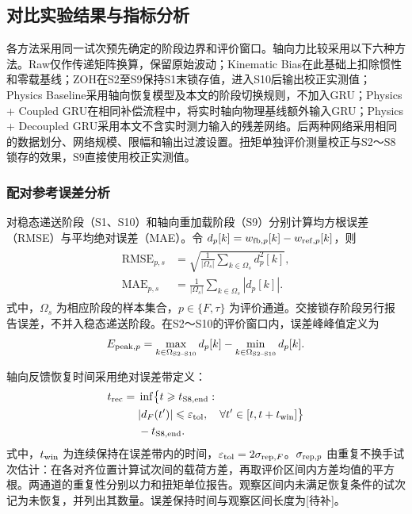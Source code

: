 \documentclass{JQRnew}
\providecommand{\RevisionColor}{\color{black}}
\newcommand{\revbegin}{\begingroup\RevisionColor}
\newcommand{\revend}{\par\endgroup}
\begin{document}
\subsection{对比实验结果与指标分析}

\revbegin
各方法采用同一试次预先确定的阶段边界和评价窗口。轴向力比较采用以下六种方法。Raw仅作传递矩阵换算，保留原始波动；Kinematic Bias在此基础上扣除惯性和零载基线；ZOH在S2至S9保持S1末锁存值，进入S10后输出校正实测值；Physics Baseline采用轴向恢复模型及本文的阶段切换规则，不加入GRU；Physics + Coupled GRU在相同补偿流程中，将实时轴向物理基线额外输入GRU；Physics + Decoupled GRU采用本文不含实时测力输入的残差网络。后两种网络采用相同的数据划分、网络规模、限幅和输出过渡设置。扭矩单独评价测量校正与S2～S8锁存的效果，S9直接使用校正实测值。
\revend

\revbegin
\subsubsection{配对参考误差分析}
\revend

\revbegin
对稳态递送阶段（S1、S10）和轴向重加载阶段（S9）分别计算均方根误差（RMSE）与平均绝对误差（MAE）。令 $d_p[k]=w_{{\rm fb},p}[k]-w_{{\rm ref},p}[k]$，则
\begin{align}
\label{eq:rmse-mae}
\begin{aligned}
\mathrm{RMSE}_{p,s}&=\sqrt{\frac{1}{|\Omega_s|}\sum_{k\in\Omega_s}d_p^2[k]},\\
\mathrm{MAE}_{p,s}&=\frac{1}{|\Omega_s|}\sum_{k\in\Omega_s}|d_p[k]|.
\end{aligned}
\end{align}
式中，$\Omega_s$ 为相应阶段的样本集合，$p\in\{F,\tau\}$ 为评价通道。交接锁存阶段另行报告误差，不并入稳态递送阶段。在S2～S10的评价窗口内，误差峰峰值定义为
\begin{align}
\label{eq:peak-error}
E_{{\rm peak},p}=
\max_{k\in\Omega_{\rm S2\text{--}S10}}d_p[k]
-\min_{k\in\Omega_{\rm S2\text{--}S10}}d_p[k].
\end{align}
\revend

\revbegin
轴向反馈恢复时间采用绝对误差带定义：
\begin{align}
\label{eq:recovery-time}
\begin{aligned}
t_{\rm rec}={}&\inf\bigl\{t\ge t_{\rm S8,end}:\\
&|d_F(t')|\le\varepsilon_{\rm tol},\quad
\forall t'\in[t,t+t_{\rm win}]\bigr\}\\
&-t_{\rm S8,end}.
\end{aligned}
\end{align}
式中，$t_{\rm win}$ 为连续保持在误差带内的时间，$\varepsilon_{\rm tol}=2\sigma_{{\rm rep},F}$。$\sigma_{{\rm rep},p}$ 由重复不换手试次估计：在各对齐位置计算试次间的载荷方差，再取评价区间内方差均值的平方根。两通道的重复性分别以力和扭矩单位报告。观察区间内未满足恢复条件的试次记为未恢复，并列出其数量。误差保持时间与观察区间长度为[待补]。
\revend
\end{document}
